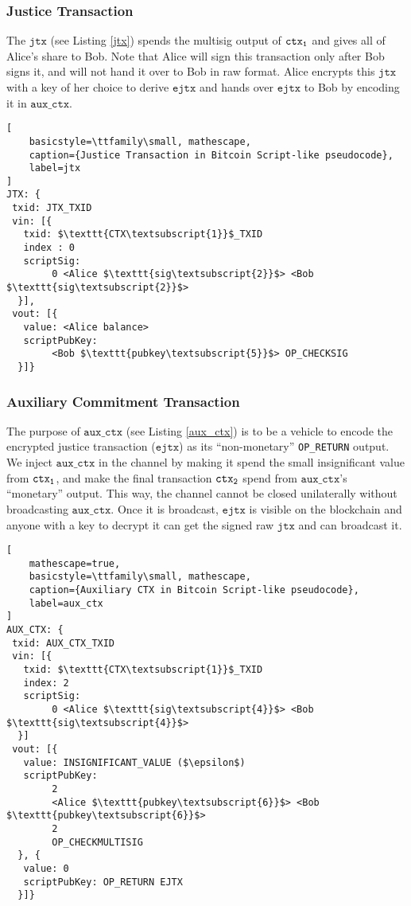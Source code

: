 \subsubsection{Justice Transaction}
The $\texttt{jtx}$ (see Listing \ref{jtx}) spends the multisig output of $\texttt{ctx\textsubscript{1}}$ and gives all of Alice's share to Bob. Note that Alice will sign this transaction only after Bob signs it, and will not hand it over to Bob in raw format. Alice encrypts this $\texttt{jtx}$ with a key of her choice to derive $\texttt{ejtx}$ and hands over $\texttt{ejtx}$ to Bob by encoding it in $\texttt{aux\_ctx}$. 

\begin{lstlisting}[
    basicstyle=\ttfamily\small, mathescape,
    caption={Justice Transaction in Bitcoin Script-like pseudocode},
    label=jtx
]
JTX: {
 txid: JTX_TXID
 vin: [{
   txid: $\texttt{CTX\textsubscript{1}}$_TXID
   index : 0
   scriptSig: 
        0 <Alice $\texttt{sig\textsubscript{2}}$> <Bob $\texttt{sig\textsubscript{2}}$>
  }],
 vout: [{
   value: <Alice balance>
   scriptPubKey: 
        <Bob $\texttt{pubkey\textsubscript{5}}$> OP_CHECKSIG
  }]}
\end{lstlisting}

\subsubsection{Auxiliary Commitment Transaction}
The purpose of $\texttt{aux\_ctx}$ (see Listing \ref{aux_ctx}) is to be a vehicle to encode the encrypted justice transaction ($\texttt{ejtx}$) as its ``non-monetary'' \texttt{OP\_RETURN} output. We inject $\texttt{aux\_ctx}$ in the channel by making it spend the small insignificant value from $\texttt{ctx\textsubscript{1}}$, and make the final transaction $\texttt{ctx\textsubscript{2}}$ spend from $\texttt{aux\_ctx}$'s ``monetary'' output. This way, the channel cannot be closed unilaterally without broadcasting $\texttt{aux\_ctx}$. Once it is broadcast, $\texttt{ejtx}$ is visible on the blockchain and anyone with a key to decrypt it can get the signed raw $\texttt{jtx}$ and can broadcast it.

\begin{lstlisting}[
    mathescape=true,
    basicstyle=\ttfamily\small, mathescape,
    caption={Auxiliary CTX in Bitcoin Script-like pseudocode},
    label=aux_ctx
]
AUX_CTX: {
 txid: AUX_CTX_TXID
 vin: [{
   txid: $\texttt{CTX\textsubscript{1}}$_TXID
   index: 2
   scriptSig: 
        0 <Alice $\texttt{sig\textsubscript{4}}$> <Bob $\texttt{sig\textsubscript{4}}$>
  }]
 vout: [{
   value: INSIGNIFICANT_VALUE ($\epsilon$)
   scriptPubKey: 
        2 
        <Alice $\texttt{pubkey\textsubscript{6}}$> <Bob $\texttt{pubkey\textsubscript{6}}$> 
        2 
        OP_CHECKMULTISIG
  }, {
   value: 0
   scriptPubKey: OP_RETURN EJTX
  }]}
\end{lstlisting}


